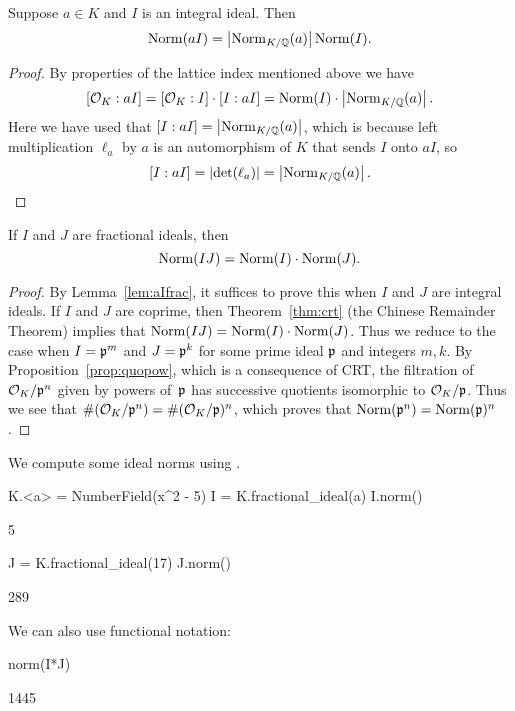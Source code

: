 \begin{lemma}\label{lem:aIfrac}
Suppose $a\in K$ and $I$ is an integral ideal.
Then
\[
  \operatorname{Norm}(a I) = \left|\operatorname{Norm}_{K/\mathbb{Q}}(a)\right| \operatorname{Norm}(I).
\]
\end{lemma}
\begin{proof}
By properties of the lattice index mentioned above we have
\[
 [\mathcal{O}_K : aI] = [\mathcal{O}_K : I] \cdot [I:aI]
             = \operatorname{Norm}(I) \cdot \left|\operatorname{Norm}_{K/\mathbb{Q}}(a)\right|.
\]
Here we have used that $[I:aI]=\left|\operatorname{Norm}_{K/\mathbb{Q}}(a)\right|$, which is because left
multiplication $\ell_a$ by $a$ is an automorphism of $K$ that sends $I$ onto
$aI$, so $$[I:aI]=\left|\det(\ell_a)\right|=\left|\operatorname{Norm}_{K/\mathbb{Q}}(a)\right|.$$
\end{proof}

\begin{proposition}
If $I$ and $J$ are fractional ideals, then
$$\operatorname{Norm}(IJ) = \operatorname{Norm}(I)\cdot \operatorname{Norm}(J).$$
\end{proposition}
\begin{proof}
By Lemma~\ref{lem:aIfrac}, it suffices to prove this when $I$ and $J$ are
integral ideals.  If $I$ and $J$ are coprime, then
Theorem~\ref{thm:crt} (the Chinese Remainder Theorem) implies that
$\operatorname{Norm}(IJ) = \operatorname{Norm}(I)\cdot \operatorname{Norm}(J)$.  Thus we reduce to the case when
$I=\mathfrak{p}^m$ and $J=\mathfrak{p}^k$ for some prime ideal $\mathfrak{p}$ and integers $m,k$.
By Proposition~\ref{prop:quopow}, which is
a consequence of CRT, the filtration of $\mathcal{O}_K/\mathfrak{p}^{n}$ given
by powers of~$\mathfrak{p}$ has successive quotients isomorphic to $\mathcal{O}_K/\mathfrak{p}$.
Thus  we see that $\#(\mathcal{O}_K/\mathfrak{p}^{n}) = \#(\mathcal{O}_K/\mathfrak{p})^{n}$, which proves that
$\operatorname{Norm}(\mathfrak{p}^n)=\operatorname{Norm}(\mathfrak{p})^n$.
\end{proof}

\begin{example}
We compute some ideal norms using \sage.
\begin{sagecode}
\begin{sagecell}
K.<a> = NumberField(x^2 - 5)
I = K.fractional_ideal(a)
I.norm()
\end{sagecell}
\begin{sageout}
5
\end{sageout}
\begin{sagecell}
J = K.fractional_ideal(17)
J.norm()
\end{sagecell}
\begin{sageout}
289
\end{sageout}
\end{sagecode} %

\noindent{} We can also use functional notation:
\begin{sagecode}
\begin{sagecell}
norm(I*J)
\end{sagecell}
\begin{sageout}
1445
\end{sageout}
\end{sagecode}
\end{example}

